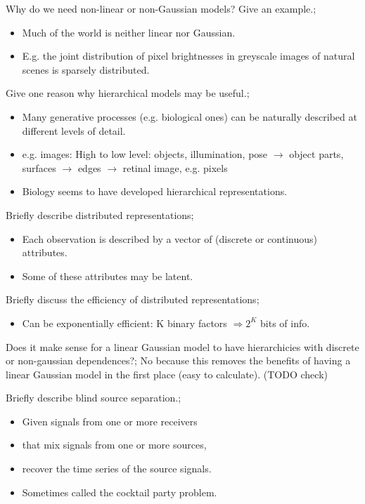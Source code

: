 \documentclass{article}
\begin{document}

Why do we need non-linear or non-Gaussian models? Give an example.; \begin{itemize}
    \item Much of the world is neither linear nor Gaussian.
    \item E.g. the joint distribution of pixel brightnesses in greyscale images of natural scenes is sparsely distributed.
\end{itemize}

Give one reason why hierarchical models may be useful.; \begin{itemize}
    \item Many generative processes (e.g. biological ones) can be naturally described at different levels of detail. 
    \item e.g. images: High to low level: objects, illumination, pose $\rightarrow$ object parts, surfaces $\rightarrow$ edges $\rightarrow$ retinal image, e.g. pixels
    \item Biology seems to have developed hierarchical representations.
\end{itemize}

Briefly describe distributed representations; \begin{itemize}
    \item Each observation is described by a vector of (discrete or continuous) attributes.
    \item Some of these attributes may be latent.
\end{itemize}

Briefly discuss the efficiency of distributed representations; \begin{itemize}
    \item Can be exponentially efficient: K binary factors $\Rightarrow 2^K$ bits of info.
\end{itemize}

Does it make sense for a linear Gaussian model to have hierarchicies with discrete or non-gaussian dependences?; No because this removes the benefits of having a linear Gaussian model in the first place (easy to calculate). (TODO check)

Briefly describe blind source separation.; \begin{itemize}
    \item Given signals from one or more receivers 
    \item that mix signals from one or more sources,
    \item recover the time series of the source signals.
    \item Sometimes called the cocktail party problem.
\end{itemize}
\end{document}
